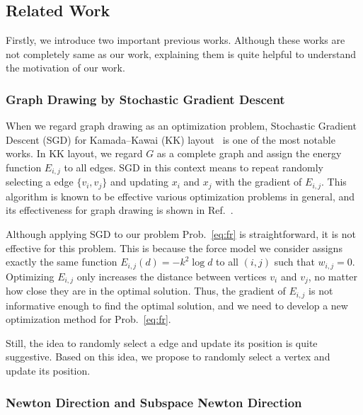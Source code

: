 \documentclass[dvipdfmx,10pt,journal,compsoc]{IEEEtran}
\begin{document}
\subsection{Related Work}\label{ssec:relatedWork}

Firstly, we introduce two important previous works. Although these works are not completely same as our work, explaining them is quite helpful to understand the motivation of our work.

\subsubsection{Graph Drawing by Stochastic Gradient Descent}\label{ssec:sgd}

When we regard graph drawing as an optimization problem, Stochastic Gradient Descent (SGD) for Kamada--Kawai (KK) layout~\cite{kamadaAlgorithmDrawingGeneral1989} is one of the most notable works.
In KK layout, we regard $G$ as a complete graph and assign the energy function $E_{i,j}$ to all edges.
SGD in this context means to repeat randomly selecting a edge $\{v_i,v_j\}$ and updating $x_i$ and $x_j$ with the gradient of $E_{i,j}$. This algorithm is known to be effective various optimization problems in general, and its effectiveness for graph drawing is shown in Ref.~\cite{8419285}.

Although applying SGD to our problem Prob.~\eqref{eq:fr} is straightforward, it is not effective for this problem.
This is because the force model we consider assigns exactly the same function $E_{i,j}(d)=-k^2\log{d}$ to all $(i,j)$ such that $w_{i,j}=0$. Optimizing $E_{i,j}$ only increases the distance between vertices $v_i$ and $v_j$, no matter how close they are in the optimal solution. Thus, the gradient of $E_{i,j}$ is not informative enough to find the optimal solution, and we need to develop a new optimization method for Prob.~\eqref{eq:fr}.

Still, the idea to randomly select a edge and update its position is quite suggestive. Based on this idea, we propose to randomly select a vertex and update its position.

\subsubsection{Newton Direction and Subspace Newton Direction}\label{ssec:introNewton}
\end{document}
